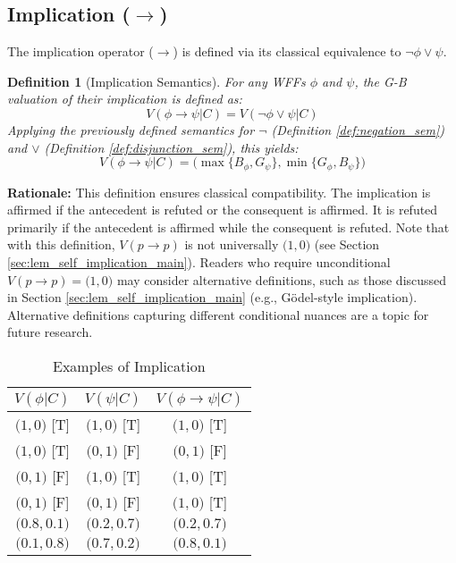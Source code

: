 \documentclass[11pt]{article}
\newcommand{\GB}[2]{\bigl(#1,#2\bigr)} %
\newtheorem{definition}{Definition}[section]
\theoremstyle{remark}
\begin{document}
\subsection{\texorpdfstring{Implication ($\rightarrow$)}{Implication}}
The implication operator ($\rightarrow$) is defined via its classical equivalence to $\neg\phi \lor \psi$.
\begin{definition}[Implication Semantics] \label{def:implication_sem}
For any WFFs $\phi$ and $\psi$, the G-B valuation of their implication is defined as:
$$V(\phi \rightarrow \psi|C) = V(\neg\phi \lor \psi|C)$$
Applying the previously defined semantics for $\neg$ (Definition \ref{def:negation_sem}) and $\lor$ (Definition \ref{def:disjunction_sem}), this yields:
$$V(\phi \rightarrow \psi|C) = \GB{\max\{B_\phi, G_\psi\}}{\min\{G_\phi, B_\psi\}}$$
\end{definition}
\textbf{Rationale:} This definition ensures classical compatibility. The implication is affirmed if the antecedent is refuted or the consequent is affirmed. It is refuted primarily if the antecedent is affirmed while the consequent is refuted. Note that with this definition, $V(p \rightarrow p)$ is not universally $\GB{1}{0}$ (see Section \ref{sec:lem_self_implication_main}). Readers who require unconditional $V(p\rightarrow p)=\GB{1}{0}$ may consider alternative definitions, such as those discussed in Section \ref{sec:lem_self_implication_main} (e.g., Gödel-style implication). Alternative definitions capturing different conditional nuances are a topic for future research.
\begin{table}[H] \centering \caption{Examples of Implication}\label{tab:implication_examples}
\begin{tabular}{@{}ccc@{}} \toprule
\textbf{$V(\phi|C)$} & \textbf{$V(\psi|C)$} & \textbf{$V(\phi \rightarrow \psi|C)$} \\ \midrule
$\GB{1}{0}$ [T] & $\GB{1}{0}$ [T] & $\GB{1}{0}$ [T] \\
$\GB{1}{0}$ [T] & $\GB{0}{1}$ [F] & $\GB{0}{1}$ [F] \\
$\GB{0}{1}$ [F] & $\GB{1}{0}$ [T] & $\GB{1}{0}$ [T] \\
$\GB{0}{1}$ [F] & $\GB{0}{1}$ [F] & $\GB{1}{0}$ [T] \\
$\GB{0.8}{0.1}$ & $\GB{0.2}{0.7}$ & $\GB{0.2}{0.7}$ \\ 
$\GB{0.1}{0.8}$ & $\GB{0.7}{0.2}$ & $\GB{0.8}{0.1}$ \\ \bottomrule
\end{tabular} \end{table}
\end{document}
